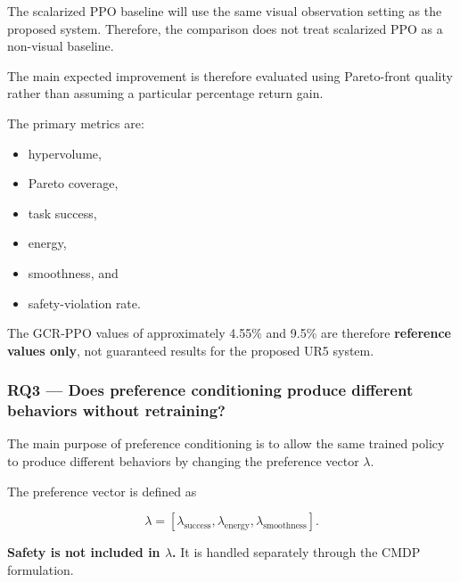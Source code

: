 \documentclass[journal]{IEEEtran}
\begin{document}
The scalarized PPO baseline will use the same visual observation
setting as the proposed system. Therefore, the comparison does not
treat scalarized PPO as a non-visual baseline.

The main expected improvement is therefore evaluated using Pareto-front
quality rather than assuming a particular percentage return gain.

The primary metrics are:

\begin{itemize}
    \item hypervolume,
    \item Pareto coverage,
    \item task success,
    \item energy,
    \item smoothness, and
    \item safety-violation rate.
\end{itemize}

The GCR-PPO values of approximately 4.55\% and 9.5\% are therefore
\textbf{reference values only}, not guaranteed results for the proposed
UR5 system.


\subsubsection{RQ3 --- Does preference conditioning produce different
behaviors without retraining?}

The main purpose of preference conditioning is to allow the same
trained policy to produce different behaviors by changing the
preference vector $\lambda$.

The preference vector is defined as

\begin{equation}
\lambda =
[
\lambda_{\mathrm{success}},
\lambda_{\mathrm{energy}},
\lambda_{\mathrm{smoothness}}
].
\end{equation}

\textbf{Safety is not included in $\lambda$.} It is handled separately
through the CMDP formulation.
\end{document}
